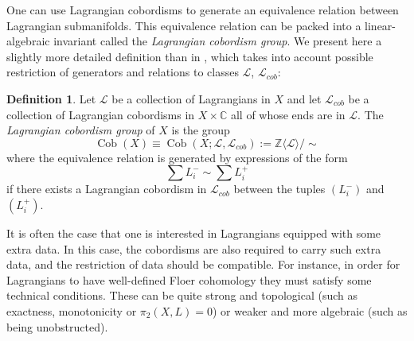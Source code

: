 \documentclass[10pt]{amsart}
\theoremstyle{definition}
\newtheorem{defn}[thm]{Definition}
\theoremstyle{remark}
\def\C{\mathbb{C}}
\def\Z{\mathbb{Z}}
\DeclareMathOperator{\Cob}{Cob}
\newcommand{\mcal}{\mathcal}
\newcommand{\vspan}[1]{\langle #1 \rangle}
\def\x{\times}
\begin{document}
One can use Lagrangian cobordisms to generate an equivalence relation between Lagrangian submanifolds.
This equivalence relation can be packed into a linear-algebraic invariant called the \emph{Lagrangian cobordism group}.
We present here a slightly more detailed definition than in , which takes into account possible restriction of generators and relations to classes $\mcal L$, $\mcal L_{cob}$:
\begin{defn}\label{defn:lagcobgroup}
    Let $\mcal L$ be a collection of Lagrangians in $X$ and let $\mcal L_{cob}$ be a collection of Lagrangian cobordisms in $X \x \C$ all of whose ends are in $\mcal L$.
    The \emph{Lagrangian cobordism group} of $X$ is the group
    $$
        \Cob(X) \equiv \Cob(X;\mcal L,\mcal L_{cob})  := \Z \vspan{\mcal L}/\sim
    $$
    where the equivalence relation is generated by expressions of the form 
    $$
    \sum L_i^- \sim \sum L_i^+ 
    $$
    if there exists a Lagrangian cobordism in $\mcal L_{cob}$ between the tuples $(L_i^-)$ and $(L_i^+)$.
\end{defn}

It is often the case that one is interested in Lagrangians equipped with some extra data.
In this case, the cobordisms are also required to carry such extra data, and the restriction of data should be compatible.
For instance, in order for Lagrangians to have well-defined Floer cohomology they must satisfy some technical conditions.
These can be quite strong and topological (such as exactness, monotonicity or $\pi_2(X,L)=0$) or weaker and more algebraic (such as being unobstructed).
\end{document}
